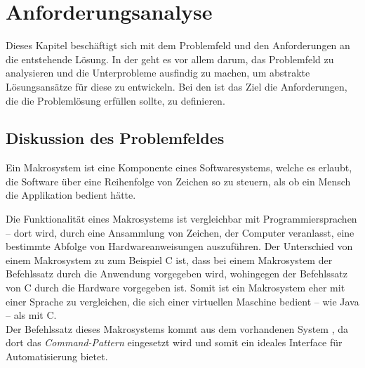 \section{An\-for\-de\-rungs\-ana\-ly\-se}
\label{sec:Anforderungsanalyse}
  Dieses Kapitel beschäftigt sich mit dem Problemfeld und den Anforderungen an die entstehende Lösung. In der  geht es vor allem darum, das Problemfeld zu analysieren und die Unterprobleme ausfindig zu machen, um abstrakte Lösungsansätze für diese zu entwickeln. Bei den  ist das Ziel die Anforderungen, die die Problemlösung erfüllen sollte, zu definieren.

  \subsection{Diskussion des Problemfeldes}
  \label{ssec:Diskussion des Problemfeldes}
    Ein Makrosystem ist eine Komponente eines Softwaresystems, welche es erlaubt, die Software über eine Reihenfolge von Zeichen so zu steuern, als ob ein Mensch die Applikation bedient hätte.

    Die Funktionalität eines Makrosystems ist vergleichbar mit Programmiersprachen -- dort wird, durch eine Ansammlung von Zeichen, der Computer veranlasst, eine bestimmte Abfolge von Hardwareanweisungen auszuführen. Der Unterschied von einem Makrosystem zu zum Beispiel C ist, dass bei einem Makrosystem der Befehlssatz durch die Anwendung vorgegeben wird, wohingegen der Befehlssatz von C durch die
    Hardware %
    vorgegeben ist.
    Somit ist ein Makrosystem eher mit einer Sprache zu vergleichen, die sich einer virtuellen Maschine bedient -- wie Java -- als mit C. %
    \\
    Der Befehlssatz dieses Makrosystems kommt aus dem vorhandenen
    System %
    , da dort das \emph{Command-Pattern} \autocite[S.263]{Gamma:1995:DPE:186897} eingesetzt wird und somit ein ideales Interface für Automatisierung bietet.

